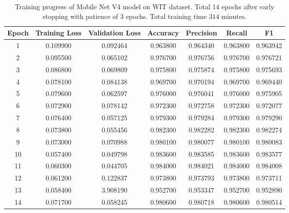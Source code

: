 \documentclass[a4paper]{article}
\begin{document}
\begin{table}[H]
    \centering
    \caption{Training progress of Mobile Net V4 model on WIT dataset. Total $14$ epochs after early stopping with patience of $3$ epochs. Total training time $314$ minutes.}
    \label{tab:mobile_net_wit_training_progress}
    \begin{tabular}{ccccccc}
        \toprule
        \textbf{Epoch} & \textbf{Training Loss} & \textbf{Validation Loss} & \textbf{Accuracy} & \textbf{Precision} & \textbf{Recall} & \textbf{F1} \\
        \midrule
        1  & 0.109900 & 0.092464 & 0.963800 & 0.964340 & 0.963800 & 0.963942 \\
        2  & 0.095500 & 0.065102 & 0.976700 & 0.976756 & 0.976700 & 0.976721 \\
        3  & 0.086800 & 0.069809 & 0.975800 & 0.975874 & 0.975800 & 0.975693 \\
        4  & 0.078100 & 0.084138 & 0.969700 & 0.970194 & 0.969700 & 0.969440 \\
        5  & 0.079600 & 0.062597 & 0.976000 & 0.976041 & 0.976000 & 0.975905 \\
        6  & 0.072900 & 0.078142 & 0.972300 & 0.972758 & 0.972300 & 0.972077 \\
        7  & 0.076400 & 0.057125 & 0.979300 & 0.979284 & 0.979300 & 0.979290 \\
        8  & 0.073800 & 0.055456 & 0.982300 & 0.982282 & 0.982300 & 0.982274 \\
        9  & 0.073000 & 0.070988 & 0.980100 & 0.980077 & 0.980100 & 0.980083 \\
        10 & 0.057400 & 0.049798 & 0.983600 & 0.983585 & 0.983600 & 0.983577 \\
        11 & 0.060300 & 0.044705 & 0.984000 & 0.984021 & 0.984000 & 0.984008 \\
        12 & 0.061200 & 0.122837 & 0.973800 & 0.973793 & 0.973800 & 0.973711 \\
        13 & 0.058400 & 3.908190 & 0.952700 & 0.953347 & 0.952700 & 0.952890 \\
        14 & 0.071700 & 0.058245 & 0.980600 & 0.980718 & 0.980600 & 0.980514 \\
        \bottomrule
    \end{tabular}
\end{table}
\end{document}
